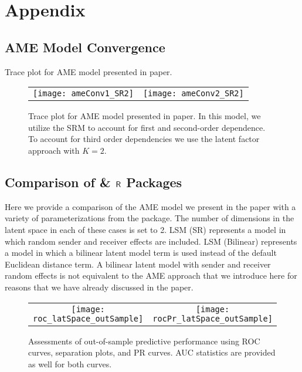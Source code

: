 \clearpage

\renewcommand{\thefigure}{A\arabic{figure}}
\setcounter{figure}{0}
\renewcommand{\thetable}{A.\arabic{table}}
\setcounter{table}{0}
\renewcommand{\thesection}{A.\arabic{section}}
\setcounter{section}{0}

\section{\textbf{Appendix}}

\subsection{AME Model Convergence}
\label{sec:ameConvAppendix}

Trace plot for AME model presented in paper.  

\begin{figure}[ht]
	\centering
	\begin{tabular}{cc}
	\texttt{[image: ameConv1\_SR2]} &
	\texttt{[image: ameConv2\_SR2]}
	\end{tabular}
	\caption{Trace plot for AME model presented in paper. In this model, we utilize the SRM to account for first and second-order dependence. To account for third order dependencies we use the latent factor approach with $K=2$.}
	\label{fig:ameConv}
\end{figure}
\FloatBarrier
\newpage

\subsection{Comparison of  \&  $\sf{R}$ Packages}
\label{sec:ameVsLatentnetAppendix}

Here we provide a comparison of the AME model we present in the paper with a variety of parameterizations from the  package. The number of dimensions in the latent space in each of these cases is set to 2. LSM (SR) represents a model in which random sender and receiver effects are included. LSM (Bilinear) represents a model in which a bilinear latent model term is used instead of the default Euclidean distance term. A bilinear latent model with sender and receiver random effects is not equivalent to the AME approach that we introduce here for reasons that we have already discussed in the paper. 



\begin{figure}[ht]
	\centering
	\begin{tabular}{cc}
	\texttt{[image: roc\_latSpace\_outSample]} & 
	\texttt{[image: rocPr\_latSpace\_outSample]}
	\end{tabular}
	\caption{Assessments of out-of-sample predictive performance using ROC curves, separation plots, and PR curves. AUC statistics are provided as well for both curves.}
	\label{fig:roc_latentSpace}
\end{figure}

